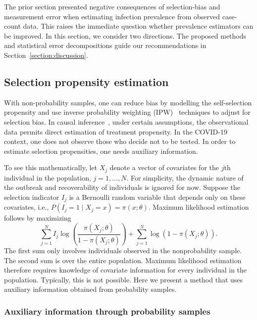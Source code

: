\documentclass[11pt]{amsart}
\numberwithin{equation}{section}
\theoremstyle{plain}
\begin{document}
The prior section presented negative consequences of selection-bias and measurement error when estimating infection prevalence from observed case-count data.  This raises the immediate question whether prevalence estimators can be improved.  In this section, we consider two directions.
The proposed methods and statistical error decompositions guide our recommendations in Section~\ref{section:discussion}.

\subsection{Selection propensity estimation}

With non-probability samples, one can reduce bias by modelling the self-selection propensity and use inverse probability weighting (IPW)~\citep{Elliott2017} techniques to adjust for selection bias.  In causal inference~\citep{Hernan2020}, under certain assumptions, the observational data permits direct estimation of treatment propensity.  In the COVID-19 context, one does not observe those who decide not to be tested.  In order to estimate selection propensities, one needs auxiliary information.

To see this mathematically, let $X_j$ denote a vector of covariates for the $j$th individual in the population, $j=1,\ldots,N$.  For simplicity, the dynamic nature of the outbreak and recoverability of individuals is ignored for now. Suppose the selection indicator $I_j$ is a Bernoulli random variable that depends only on these covariates, i.e., $P(I_j = 1 \mid X_j = x) = \pi (x; \theta)$. Maximum likelihood estimation follows by maximizing
\begin{equation}
\label{eq:propensity}
\sum_{j=1}^N I_j \log \left( \frac{\pi (X_j; \theta)}{1-\pi(X_j; \theta)} \right) + \sum_{j=1}^N \log \left( 1 - \pi (X_j; \theta) \right).
\end{equation}
The first sum only involves individuals observed in the nonprobability sample.
The second sum is over the entire population.  Maximum likelihood estimation therefore requires knowledge of covariate information for every individual in the population.  Typically, this is not possible.  Here we present a method that uses auxiliary information obtained from probability samples.

\subsubsection{Auxiliary information through probability samples}
\label{subsec:auxprob}
\end{document}
